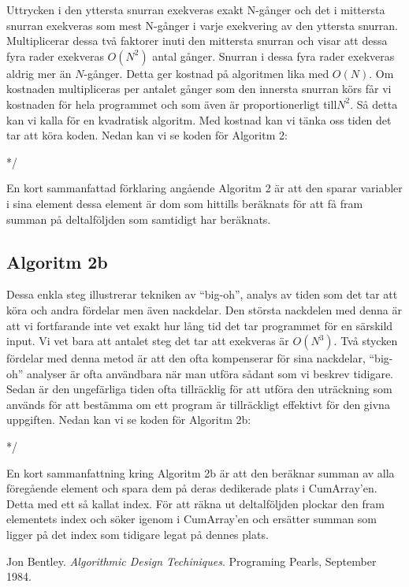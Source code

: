 \documentclass[a4paper,12pt]{article}
\begin{document}
Uttrycken i den yttersta snurran exekveras exakt N-gånger och det i mittersta
snurran exekveras som mest N-gånger i varje exekvering av den yttersta
snurran. Multiplicerar dessa två faktorer inuti den mittersta snurran och visar
att
dessa fyra rader exekveras $O(N^2)$ antal gånger. Snurran i dessa fyra rader
exekveras aldrig mer än $N$-gånger. Detta ger kostnad på algoritmen lika med
 $O(N)$. Om kostnaden multipliceras per antalet gånger som den innersta snurran
körs får vi kostnaden för hela programmet och som även är proportionerligt
till$N^2$. Så detta kan vi kalla för en kvadratisk algoritm. Med kostnad kan vi
tänka oss tiden det tar att köra koden. Nedan kan vi se koden
för Algoritm 2:
%
\begin{center}
%
\begin{algorithmic} 
%
\newpage
%
  	 \ENDFOR
  	  */
 	 \ENDFOR
 \ENDFOR
\end{algorithmic}
%
\end{center}
%
En kort sammanfattad förklaring angående Algoritm 2 är att den sparar variabler
i sina
element dessa element är dom som hittills beräknats för att få fram summan på 
deltalföljden som samtidigt har beräknats.
%

\subsection{Algoritm 2b}


Dessa enkla steg illustrerar tekniken av “big-oh”, analys av tiden som det
tar att köra och andra fördelar men även nackdelar. Den största nackdelen med
denna är att vi fortfarande inte vet exakt hur lång tid det tar programmet för
en
särskild input. Vi vet bara att antalet steg det tar att exekveras är $O(N^3)$.
Två stycken fördelar med denna metod är att den ofta kompenserar för sina
nackdelar, “big-oh” analyser är ofta användbara när man utföra sådant som
vi beskrev tidigare. Sedan är den ungefärliga tiden ofta tillräcklig för att
utföra den uträckning som används för att bestämma om ett program är
tillräckligt effektivt för den givna uppgiften. Nedan kan vi se koden för 
Algoritm 2b:
%
\begin{center}
%
\begin{algorithmic}
%
  	 \ENDFOR
  	  */
 	 \ENDFOR
 \ENDFOR
\end{algorithmic}
%
\end{center}
%
En kort sammanfattning kring Algoritm 2b är att den beräknar summan av alla  
föregående element och spara dem på deras dedikerade plats i CumArray'en.
Detta med ett så kallat index. För att räkna ut deltalföljden plockar 
den fram elementets index och söker igenom i CumArray'en och ersätter summan 
som ligger på det index som tidigare legat på dennes plats.
%


\begin{thebibliography}{99}
%
Jon Bentley. 
\textit{Algorithmic Design Techiniques}. 
Programing Pearls, September 1984.
%
\end{thebibliography}
%
\end{document}
